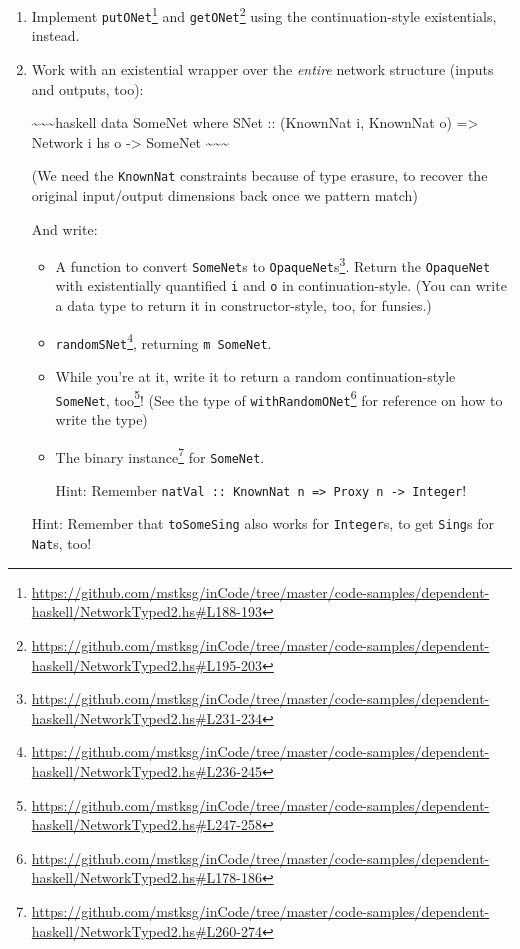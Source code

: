 \documentclass[]{article}
\renewcommand{\href}[2]{#2\footnote{\url{#1}}}
\begin{document}
\begin{enumerate}
\item
  Implement
  \href{https://github.com/mstksg/inCode/tree/master/code-samples/dependent-haskell/NetworkTyped2.hs\#L188-193}{\texttt{putONet\textquotesingle{}}}
  and
  \href{https://github.com/mstksg/inCode/tree/master/code-samples/dependent-haskell/NetworkTyped2.hs\#L195-203}{\texttt{getONet\textquotesingle{}}}
  using the continuation-style existentials, instead.
\item
  Work with an existential wrapper over the \emph{entire} network structure
  (inputs and outputs, too):

  \textasciitilde{}\textasciitilde{}\textasciitilde{}haskell data SomeNet where
  SNet :: (KnownNat i, KnownNat o) =\textgreater{} Network i hs o
  -\textgreater{} SomeNet \textasciitilde{}\textasciitilde{}\textasciitilde{}

  (We need the \texttt{KnownNat} constraints because of type erasure, to recover
  the original input/output dimensions back once we pattern match)

  And write:

  \begin{itemize}
  \item
    A function to
    \href{https://github.com/mstksg/inCode/tree/master/code-samples/dependent-haskell/NetworkTyped2.hs\#L231-234}{convert
    \texttt{SomeNet}s to \texttt{OpaqueNet}s}. Return the \texttt{OpaqueNet}
    with existentially quantified \texttt{i} and \texttt{o} in
    continuation-style. (You can write a data type to return it in
    constructor-style, too, for funsies.)
  \item
    \href{https://github.com/mstksg/inCode/tree/master/code-samples/dependent-haskell/NetworkTyped2.hs\#L236-245}{\texttt{randomSNet}},
    returning \texttt{m\ SomeNet}.
  \item
    While you're at it, write it to return
    \href{https://github.com/mstksg/inCode/tree/master/code-samples/dependent-haskell/NetworkTyped2.hs\#L247-258}{a
    random continuation-style \texttt{SomeNet}, too}! (See the type of
    \href{https://github.com/mstksg/inCode/tree/master/code-samples/dependent-haskell/NetworkTyped2.hs\#L178-186}{\texttt{withRandomONet\textquotesingle{}}}
    for reference on how to write the type)
  \item
    The
    \href{https://github.com/mstksg/inCode/tree/master/code-samples/dependent-haskell/NetworkTyped2.hs\#L260-274}{binary
    instance} for \texttt{SomeNet}.

    Hint: Remember
    \texttt{natVal\ ::\ KnownNat\ n\ =\textgreater{}\ Proxy\ n\ -\textgreater{}\ Integer}!
  \end{itemize}

  Hint: Remember that \texttt{toSomeSing} also works for \texttt{Integer}s, to
  get \texttt{Sing}s for \texttt{Nat}s, too!
\end{enumerate}
\end{document}
